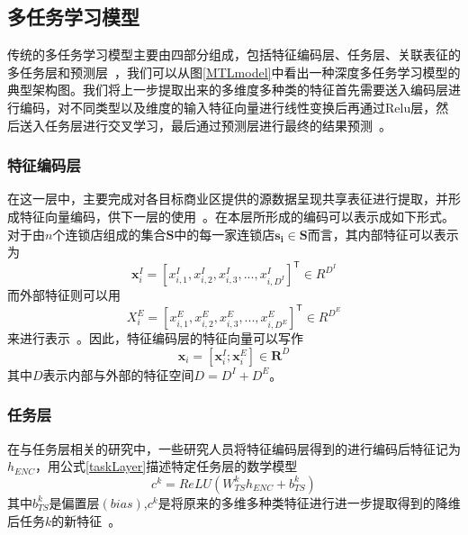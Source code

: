 \documentclass{llncs}
\begin{document}
\subsection{多任务学习模型}
传统的多任务学习模型主要由四部分组成，包括特征编码层、任务层、关联表征的多任务层和预测层~\cite{Caruana1997Multitask,Caruana2012A}，我们可以从图\ref{MTLmodel}中看出一种深度多任务学习模型的典型架构图。我们将上一步提取出来的多维度多种类的特征首先需要送入编码层进行编码，对不同类型以及维度的输入特征向量进行线性变换后再通过Relu层，然后送入任务层进行交叉学习，最后通过预测层进行最终的结果预测~\cite{zheng2014urban,Gong2014Efficient}。
\subsubsection{特征编码层}
在这一层中，主要完成对各目标商业区提供的源数据呈现共享表征进行提取，并形成特征向量编码，供下一层的使用~\cite{mariani2018business}。在本层所形成的编码可以表示成如下形式。对于由$n$个连锁店组成的集合$\mathbf{S}$中的每一家连锁店$\mathbf{s_i} \in \mathbf{S}$而言，其内部特征可以表示为
$$\mathbf{x}_i^I = [x_{i,1}^I,x_{i,2}^I,x_{i,3}^I,...,x_{i,D^I}^I]^\mathsf{T} \in R^{D^I}$$
而外部特征则可以用
$$X_i^E = [x_{i,1}^E,x_{i,2}^E,x_{i,3}^E,...,x_{i,D^E}^E]^\mathsf{T} \in R^{D^E}$$
来进行表示~\cite{Wang2018Searchable}。因此，特征编码层的特征向量可以写作
$$\mathbf{x}_i = [\mathbf{x}_i^I;\mathbf{x}_i^E] \in \mathbf{R} ^ D$$
其中$D$表示内部与外部的特征空间$D = D^I + D^E$。
\subsubsection{任务层}
在与任务层相关的研究中，一些研究人员将特征编码层得到的进行编码后特征记为$h_{ENC}$，用公式\ref{taskLayer}描述特定任务层的数学模型
\begin{equation}
	\label{taskLayer}
	c^k=ReLU(W_{TS}^kh_{ENC}+b_{TS}^k)
\end{equation}
其中$b_{TS}^k$是偏置层$(bias)$,$c^k$是将原来的多维多种类特征进行进一步提取得到的降维后任务$k$的新特征~\cite{Held2017Analyzing}。
\end{document}
